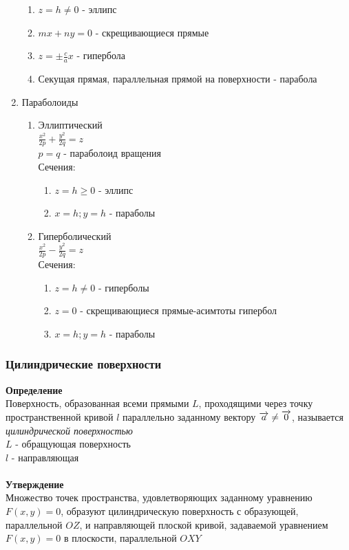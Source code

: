 \documentclass[12pt]{article}
\begin{document}
\begin{enumerate}
\begin{enumerate}
            \item $z=h \neq 0$ - эллипс
            \item $mx+ny=0$ - скрещивающиеся прямые
            \item $z=\pm \frac ca x$ - гипербола
            \item Секущая прямая, параллельная прямой на поверхности - парабола
        \end{enumerate}
        \item Параболоиды
        \begin{enumerate}
            \item Эллиптический\\
            $\frac{x^2}{2p}+\frac{y^2}{2q}=z$\\
            $p=q$ - параболоид вращения\\
            Сечения:
            \begin{enumerate}
                \item $z=h\geq 0$ - эллипс
                \item $x=h; y = h$ - параболы
            \end{enumerate}
            \item Гиперболический\\
            $\frac {x^2}{2p}-\frac{y^2}{2q}=z$\\
            Сечения:
            \begin{enumerate}
                \item $z=h\neq0$ - гиперболы
                \item $z=0$ - скрещивающиеся прямые-асимтоты гипербол
                \item $x=h; y = h$ - параболы
            \end{enumerate}
        \end{enumerate}
    \end{enumerate}
    \subsubsection{Цилиндрические поверхности}
    \textbf{Определение}\\
    Поверхность, образованная всеми прямыми $L$, проходящими через точку пространственной кривой $l$ параллельно заданному вектору $\overrightarrow{a} \neq \overrightarrow{0}$, называется \textit{цилиндрической поверхностью}\\
    $L$ - обращующая поверхность\\
    $l$ - направляющая\\\\
    \textbf{Утверждение}\\
    Множество точек пространства, удовлетворяющих заданному уравнению $F(x,y)=0$, образуют цилиндрическую поверхность с образующей, параллельной $OZ$, и направляющей плоской кривой, задаваемой уравнением $F(x,y)=0$ в плоскости, параллельной $OXY$
\end{document}
